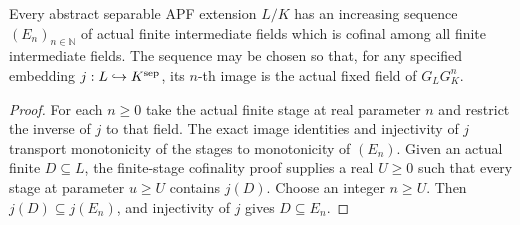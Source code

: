 \begin{lemma}
\label{fw:countable-apf-finite-layers}
\leanok
Every abstract separable APF extension $L/K$ has an increasing
sequence $(E_n)_{n\in\mathbb N}$ of actual finite intermediate
fields which is cofinal among all finite intermediate fields.
The sequence may be chosen so that, for any specified embedding
$j:L\hookrightarrow K^{\rm sep}$, its $n$-th image is the actual
fixed field of $G_LG_K^n$.
\end{lemma}
\begin{proof}
For each $n\geq0$ take the actual finite stage at real parameter
$n$ and restrict the inverse of $j$ to that field.
The exact image identities and injectivity of $j$ transport
monotonicity of the stages to monotonicity of $(E_n)$.
Given an actual finite $D\subseteq L$, the finite-stage
cofinality proof supplies a real $U\geq0$ such that every
stage at parameter $u\geq U$ contains $j(D)$.
Choose an integer $n\geq U$. Then $j(D)\subseteq j(E_n)$,
and injectivity of $j$ gives $D\subseteq E_n$.
\end{proof}

